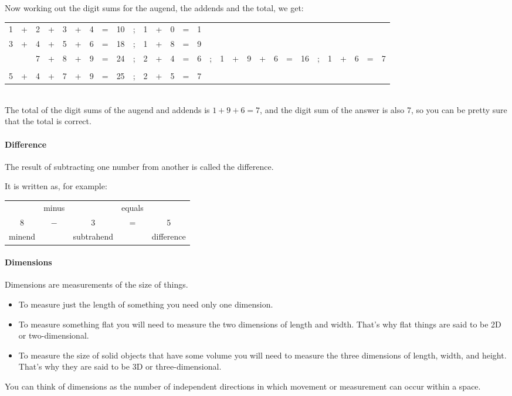 \documentclass[12pt]{article}
\begin{document}
Now working out the digit sums for the augend, the addends and the total, we get:\\

\begin{tabular}{c@{\,}c@{\,}c@{\,}c@{\,}c@{\,}c@{\,}c@{\,}c@{\,}c@{\,}cc@{\,}c@{\,}c@{\,}c@{\,}c@{\,}cc@{\,}c@{\,}c@{\,}c@{\,}c@{\,}c@{\,}c@{\,}cc@{\,}c@{\,}c@{\,}c@{\,}c@{\,}}
1&+&2&+&3&+&4&=&10&;&1&+&0&=&1&&&&&&&&&&&&&&\\
3&+&4&+&5&+&6&=&18&;&1&+&8&=&9&&&&&&&&&&&&&&\\
&&7&+&8&+&9&=&24&;&2&+&4&=&6&;&1&+&9&+&6&=&16&;&1&+&6&=&7\\
\hline
\\
5&+&4&+&7&+&9&=&25&;&2&+&5&=&7&&&&&&&&&&&&&&\\
\cline{1-15}
\end{tabular}\\

The total of the digit sums of the augend and addends is $1+9+6=7$, and the digit sum of the answer is also 7, so you can be pretty sure that the total is correct.

\paragraph{Difference}
The result of subtracting one number from another is called the difference.

It is written as, for example:

\begin{table}[H]
    \centering
    \begin{tabular}{ccccc}
     \   & minus &   \    & equals &  \ \\
     \large{8}   &  \large{$-$}   &   \large{3}    &   \large{=}    &  \large{5} \\
  minend &  \   & subtrahend &   \    & difference
    \end{tabular}
\end{table}

\paragraph{Dimensions}
Dimensions are measurements of the size of things.
\begin{itemize}
    \item To measure just the length of something you need only one dimension.
    \item To measure something flat you will need to measure the two dimensions of length and width. That's why flat things are said to be 2D or two-dimensional.
    \item To measure the size of solid objects that have some volume you will need to measure the three dimensions of length, width, and height. That's why they are said to be 3D or three-dimensional.
\end{itemize}
You can think of dimensions as the number of independent directions in which movement or measurement can occur within a space.
\end{document}
